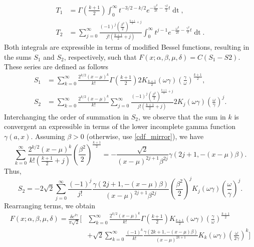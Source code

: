 \documentclass[10pt,a4paper,oneside]{article}
\numberwithin{equation}{section}
\begin{document}
\begin{align}
T_1 &= \Gamma\left(\frac{k+1}{2}\right)\int_0^{\infty}t^{-3/2-k/2} e^{-\frac{\omega^2}{2t} - \frac{\gamma^2}{2}t} \mathop{dt},\\
T_2 &= \sum_{j=0}^{\infty} \frac{(-1)^j \left(\frac{\beta^2}{2}\right)^{\frac{k+1}{2}+j}}{j! (\frac{k+1}{2}+ j)}\int_0^{\infty} t^{j-1} e^{-\frac{\omega^2}{2t} - \frac{\gamma^2}{2}t} \mathop{dt}.
\end{align}
Both integrals are expressible in terms of modified Bessel functions, resulting in the sums $S_1$ and $S_2$, respectively, such that $F(x;\alpha, \beta, \mu, \delta) = C (S_1 - S2)$. These series are defined as follows
\begin{align}
S_1 &= \sum_{k=0}^{\infty}\frac{2^{k/2}(x-\mu)^k}{k!} \Gamma\left(\frac{k+1}{2}\right)2 K_{\frac{k+1}{2}}(\omega \gamma) \left(\frac{\gamma}{\omega}\right)^{\frac{k+1}{2}},\\
S_2 &= \sum_{k=0}^{\infty}\frac{2^{k/2}(x-\mu)^k}{k!}\sum_{j=0}^{\infty}\frac{(-1)^j \left(\frac{\beta^2}{2}\right)^{\frac{k+1}{2}+j}}{j! (\frac{k+1}{2}+ j)} 2 K_j(\omega \gamma) \left(\frac{\omega}{\gamma}\right)^j.
\end{align}
Interchanging the order of summation in $S_2$, we observe that the sum in $k$ is convergent an expressible in terms of the lower incomplete gamma function $\gamma(a, x)$. Assuming $\beta > 0$ (otherwise, use \eqref{cdf_mirror}), we have
\begin{equation}
\sum_{k=0}^{\infty}\frac{2^{k/2}(x-\mu)^k}{k! (\frac{k+1}{2}+ j)} \left(\frac{\beta^2}{2}\right)^{\frac{k+1}{2}} = -\frac{\sqrt{2}}{(x-\mu)^{2j+1}\beta^{2j}} \gamma \left(2j + 1, -(x-\mu)\beta\right).
\end{equation}
Thus,
\begin{equation}
S_2 = -2\sqrt{2} \sum_{j=0}^{\infty} \frac{(-1)^j}{j!}\frac{\gamma \left(2j + 1, -(x-\mu)\beta\right)}{(x-\mu)^{2j+1}\beta^{2j}} \left(\frac{\beta^2}{2}\right)^j  K_j(\omega \gamma) \left(\frac{\omega}{\gamma}\right)^j.
\end{equation}
Rearranging terms, we obtain
\begin{align}\label{general_xmu_two_series}
F(x;\alpha, \beta, \mu, \delta) = \frac{\delta e^{\delta \gamma}}{\pi \sqrt{2}} \bigg[& \sum_{k=0}^{\infty}\frac{2^{k/2}(x-\mu)^k}{k!} \Gamma\left(\frac{k+1}{2}\right) K_{\frac{k+1}{2}}(\omega \gamma) \left(\frac{\gamma}{\omega}\right)^{\frac{k+1}{2}}\nonumber\\
& + \sqrt{2}\sum_{k=0}^{\infty} \frac{(-1)^k}{k!}\frac{\gamma \left(2k + 1, -(x-\mu)\beta\right)}{(x-\mu)^{2k+ 1}}  K_k(\omega \gamma) \left(\frac{\omega}{2\gamma}\right)^k \bigg]
\end{align}
\end{document}
